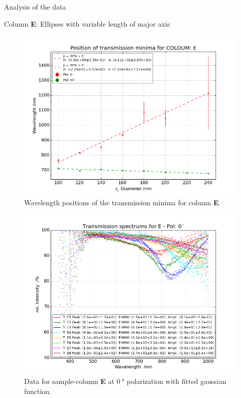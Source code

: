 \documentclass[pdftex, a4paper,11pt, twoside, UKenglish]{report}
\begin{document}
\begin{chapter}{Analysis of the data}
\begin{section}{Column \textbf{E}: Ellipses with variable length of
        major axis}
      \begin{figure}[b!]
        \centering
        \includegraphics[width=\textwidth]{Figures/MinimaPosE.png}
        \caption{Wavelength positions of the transmission minima for column
            \textbf{E}.}
        \label{fig:MinimaPosE}
      \end{figure}
      \newpage
      \begin{figure}[ht!]
        \centering
        \begin{minipage}{.95\textwidth}
          \centering
          \includegraphics[width=\textwidth]
              {Figures/TransspecFIT_EPol0.png}
          \caption{Data for sample-column \textbf{E} at $\SI{0}{\degree}$
              polarization with fitted gaussian function.}

\end{minipage}
\end{figure}
\end{section}
\end{chapter}
\end{document}
